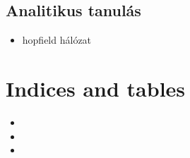\documentclass[letterpaper,10pt,magyar]{sphinxmanual}
\begin{document}
\section{Analitikus tanulás}
\label{\detokenize{pages/learning:analitikus-tanulas}}\begin{itemize}
\item {} 
hopfield hálózat

\end{itemize}


\chapter{Indices and tables}
\label{\detokenize{index:indices-and-tables}}\begin{itemize}
\item {} 

\item {} 

\item {} 

\end{itemize}



\renewcommand{\indexname}{Tárgymutató}
\printindex
\end{document}
